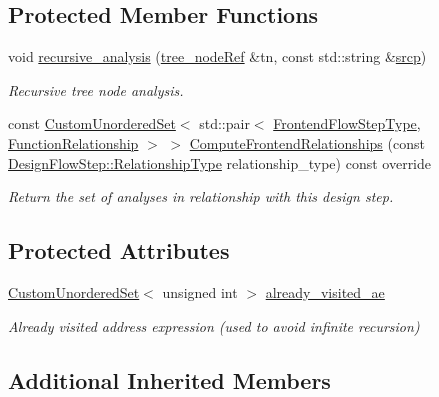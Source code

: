 \subsection*{Protected Member Functions}
\begin{DoxyCompactItemize}
\item 
void \hyperlink{classparm2ssa_a44867e8c5b5462d813b189778657809e}{recursive\+\_\+analysis} (\hyperlink{tree__node_8hpp_a6ee377554d1c4871ad66a337eaa67fd5}{tree\+\_\+node\+Ref} \&tn, const std\+::string \&\hyperlink{structsrcp}{srcp})
\begin{DoxyCompactList}\small\item\em Recursive tree node analysis. \end{DoxyCompactList}\item 
const \hyperlink{classCustomUnorderedSet}{Custom\+Unordered\+Set}$<$ std\+::pair$<$ \hyperlink{frontend__flow__step_8hpp_afeb3716c693d2b2e4ed3e6d04c3b63bb}{Frontend\+Flow\+Step\+Type}, \hyperlink{classFrontendFlowStep_af7cf30f2023e5b99e637dc2058289ab0}{Function\+Relationship} $>$ $>$ \hyperlink{classparm2ssa_aeb5979e5ccbcd6e55fea2eb82aaddec5}{Compute\+Frontend\+Relationships} (const \hyperlink{classDesignFlowStep_a723a3baf19ff2ceb77bc13e099d0b1b7}{Design\+Flow\+Step\+::\+Relationship\+Type} relationship\+\_\+type) const override
\begin{DoxyCompactList}\small\item\em Return the set of analyses in relationship with this design step. \end{DoxyCompactList}\end{DoxyCompactItemize}
\subsection*{Protected Attributes}
\begin{DoxyCompactItemize}
\item 
\hyperlink{classCustomUnorderedSet}{Custom\+Unordered\+Set}$<$ unsigned int $>$ \hyperlink{classparm2ssa_aa34aab725ce5a54255507b9da590cef5}{already\+\_\+visited\+\_\+ae}
\begin{DoxyCompactList}\small\item\em Already visited address expression (used to avoid infinite recursion) \end{DoxyCompactList}\end{DoxyCompactItemize}
\subsection*{Additional Inherited Members}


